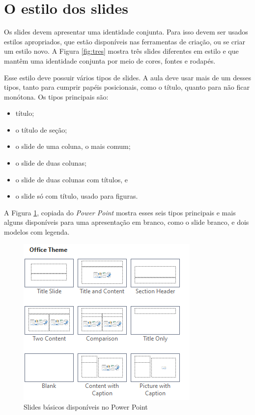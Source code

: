 \section{O estilo dos slides}

Os slides devem apresentar uma identidade conjunta. Para isso devem ser usados estilos apropriados, que estão disponíveis nas ferramentas de criação, ou se criar um estilo novo. A Figura \ref{fig:tres} mostra três slides diferentes em estilo e que mantêm uma identidade conjunta por meio de cores, fontes e rodapés.

Esse estilo deve possuir vários tipos de slides. A aula deve usar mais de um desses tipos, tanto para cumprir papéis posicionais, como o título, quanto para não ficar monótona. Os tipos principais são:
\begin{itemize}
    \item título;
    \item o título de seção;
    \item o slide de uma coluna, o mais comum;
    \item o slide de duas colunas;
    \item o slide de duas colunas com títulos, e
    \item o slide só com título, usado para figuras.
\end{itemize}


A Figura \ref{fig:tiposbasicosdopp}, copiada do \textit{Power Point} mostra esses seis tipos principais e mais alguns disponíveis para uma apresentação em branco, como o slide branco, e dois modelos com legenda.

\begin{figure}[htb]
    \centering
    \includegraphics[width=0.5\linewidth]{imagens/tiposbasicosdopp}
    \caption{Slides básicos disponíveis no Power Point}
    \label{fig:tiposbasicosdopp}
\end{figure}


